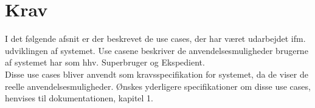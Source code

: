 \chapter{Krav}
I det følgende afsnit er der beskrevet de use cases, der har været udarbejdet ifm. udviklingen af systemet. Use casene beskriver de anvendelsesmuligheder brugerne af systemet har som hhv. Superbruger og Ekspedient.\\
Disse use cases bliver anvendt som kravsspecifikation for systemet, da de viser de reelle anvendelsesmuligheder. Ønskes yderligere specifikationer om disse use cases, henvises til dokumentationen, kapitel 1.

